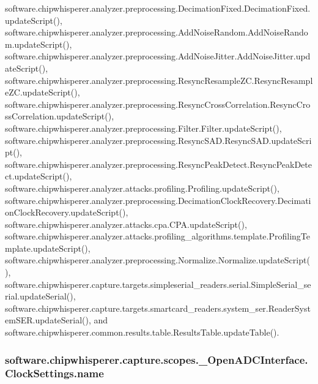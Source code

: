 software.\+chipwhisperer.\+analyzer.\+preprocessing.\+Decimation\+Fixed.\+Decimation\+Fixed.\+update\+Script(), software.\+chipwhisperer.\+analyzer.\+preprocessing.\+Add\+Noise\+Random.\+Add\+Noise\+Random.\+update\+Script(), software.\+chipwhisperer.\+analyzer.\+preprocessing.\+Add\+Noise\+Jitter.\+Add\+Noise\+Jitter.\+update\+Script(), software.\+chipwhisperer.\+analyzer.\+preprocessing.\+Resync\+Resample\+Z\+C.\+Resync\+Resample\+Z\+C.\+update\+Script(), software.\+chipwhisperer.\+analyzer.\+preprocessing.\+Resync\+Cross\+Correlation.\+Resync\+Cross\+Correlation.\+update\+Script(), software.\+chipwhisperer.\+analyzer.\+preprocessing.\+Filter.\+Filter.\+update\+Script(), software.\+chipwhisperer.\+analyzer.\+preprocessing.\+Resync\+S\+A\+D.\+Resync\+S\+A\+D.\+update\+Script(), software.\+chipwhisperer.\+analyzer.\+preprocessing.\+Resync\+Peak\+Detect.\+Resync\+Peak\+Detect.\+update\+Script(), software.\+chipwhisperer.\+analyzer.\+attacks.\+profiling.\+Profiling.\+update\+Script(), software.\+chipwhisperer.\+analyzer.\+preprocessing.\+Decimation\+Clock\+Recovery.\+Decimation\+Clock\+Recovery.\+update\+Script(), software.\+chipwhisperer.\+analyzer.\+attacks.\+cpa.\+C\+P\+A.\+update\+Script(), software.\+chipwhisperer.\+analyzer.\+attacks.\+profiling\+\_\+algorithms.\+template.\+Profiling\+Template.\+update\+Script(), software.\+chipwhisperer.\+analyzer.\+preprocessing.\+Normalize.\+Normalize.\+update\+Script(), software.\+chipwhisperer.\+capture.\+targets.\+simpleserial\+\_\+readers.\+serial.\+Simple\+Serial\+\_\+serial.\+update\+Serial(), software.\+chipwhisperer.\+capture.\+targets.\+smartcard\+\_\+readers.\+system\+\_\+ser.\+Reader\+System\+S\+E\+R.\+update\+Serial(), and software.\+chipwhisperer.\+common.\+results.\+table.\+Results\+Table.\+update\+Table().

\hypertarget{classsoftware_1_1chipwhisperer_1_1capture_1_1scopes_1_1__OpenADCInterface_1_1ClockSettings_ab8ad338dbd17ed7177906b8c3beffb30}{}
\subsubsection[{name}]{\setlength{\rightskip}{0pt plus 5cm}software.\+chipwhisperer.\+capture.\+scopes.\+\_\+\+Open\+A\+D\+C\+Interface.\+Clock\+Settings.\+name}\label{classsoftware_1_1chipwhisperer_1_1capture_1_1scopes_1_1__OpenADCInterface_1_1ClockSettings_ab8ad338dbd17ed7177906b8c3beffb30}


